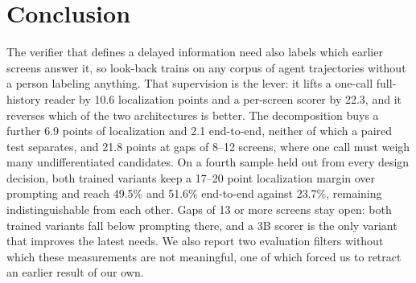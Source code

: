 \section{Conclusion}
The verifier that defines a delayed information need also labels which earlier screens answer it, so
look-back trains on any corpus of agent trajectories without a person labeling anything. That
supervision is the lever: it lifts a one-call full-history reader by 10.6 localization points and a
per-screen scorer by 22.3, and it reverses which of the two architectures is better. The
decomposition buys a further 6.9 points of localization and 2.1 end-to-end, neither of which a paired
test separates, and 21.8 points at gaps of 8--12 screens, where one call must weigh many
undifferentiated candidates. On a fourth sample held out from every design decision, both trained
variants keep a 17--20 point localization margin over prompting and reach 49.5\% and 51.6\%
end-to-end against 23.7\%, remaining indistinguishable from each other. Gaps of 13 or more screens
stay open: both trained variants fall below prompting there, and a 3B scorer is the only variant that
improves the latest needs. We also report two evaluation filters without which these measurements are
not meaningful, one of which forced us to retract an earlier result of our own.
